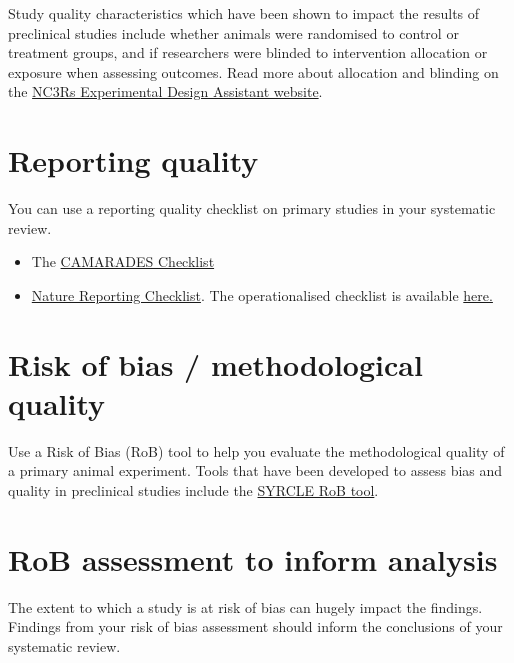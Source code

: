 \documentclass[
]{book}
\providecommand{\tightlist}{%
  \setlength{\itemsep}{0pt}\setlength{\parskip}{0pt}}
\begin{document}
Study quality characteristics which have been shown to impact the results of preclinical studies include whether animals were randomised to control or treatment groups, and if researchers were blinded to intervention allocation or exposure when assessing outcomes.
Read more about allocation and blinding on the \href{https://eda.nc3rs.org.uk/experimental-design-allocation}{NC3Rs Experimental Design Assistant website}.

\section{Reporting quality}\label{reporting-quality}

You can use a reporting quality checklist on primary studies in your systematic review.

\begin{itemize}
\tightlist
\item
  The \href{https://www.ahajournals.org/doi/pdf/10.1161/01.str.0000125719.25853.20}{CAMARADES Checklist}
\item
  \href{https://www.gene-quantification.de/checklist-for-life-sciences-articles.pdf}{Nature Reporting Checklist}. The operationalised checklist is available \href{https://link.springer.com/article/10.1007/s11192-016-1964-8/tables/6}{here.}
\end{itemize}

\section{Risk of bias / methodological quality}\label{risk-of-bias-methodological-quality}

Use a Risk of Bias (RoB) tool to help you evaluate the methodological quality of a primary animal experiment. Tools that have been developed to assess bias and quality in preclinical studies include the \href{https://bmcmedresmethodol.biomedcentral.com/track/pdf/10.1186/1471-2288-14-43}{SYRCLE RoB tool}.

\section{RoB assessment to inform analysis}\label{rob-assessment-to-inform-analysis}

The extent to which a study is at risk of bias can hugely impact the findings. Findings from your risk of bias assessment should inform the conclusions of your systematic review.
\end{document}
